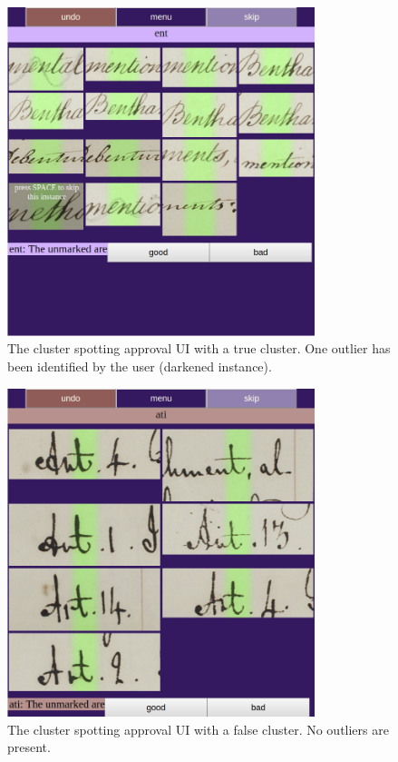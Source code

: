 \documentclass[ms,electronic,twosidetoc,letterpaper,chaptercenter,parttop,lol,lof,lot]{byumsphd}
\begin{document}
\begin{figure}
    \centering
    \includegraphics[width=0.8\textwidth]{clustergood2}
    \caption{The cluster spotting approval UI with a true cluster. One outlier has been identified by the user (darkened instance).}
    \label{fig:clustergood}
\end{figure}
\begin{figure}
    \centering
    \includegraphics[width=0.8\textwidth]{clusterbad}
    \caption{The cluster spotting approval UI with a false cluster. No outliers are present.}
    \label{fig:clusterbad}
\end{figure}
\end{document}

